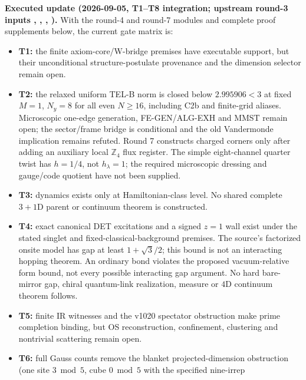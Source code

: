 \documentclass[11pt,a4paper]{article}
\newcommand{\Z}{\mathbb Z}
\begin{document}
\par\smallskip\noindent\textbf{Executed update (2026-09-05, T1--T8 integration; upstream round-3 inputs
,
,
,
).}
With the round-4 and round-7 modules and complete proof supplements below, the current
gate matrix is:
\begin{itemize}
\item \textbf{T1:} the finite axiom-core/W-bridge premises have executable
  support, but their unconditional structure-postulate provenance and the
  dimension selector remain open.
\item \textbf{T2:} the relaxed uniform TEL-B norm is closed below $2.995906<3$
  at fixed $M=1$, $N_y=8$ for all even $N\ge16$, including C2b and finite-grid aliases. Microscopic
  one-edge generation, FE-GEN/ALG-EXH and MMST remain open; the sector/frame
  bridge is conditional and the old Vandermonde implication remains refuted.
  Round 7 constructs charged corners only after adding an auxiliary local
  $\Z_4$ flux register. The simple eight-channel quarter twist has
  $h=1/4$, not $h_\lambda=1$; the required microscopic dressing and
  gauge/code quotient have not been supplied.
\item \textbf{T3:} dynamics exists only at Hamiltonian-class level.  No shared
  complete $3{+}1$D parent or continuum theorem is constructed.
\item \textbf{T4:} exact canonical DET excitations and a signed $z=1$ wall
  exist under the stated singlet and fixed-classical-background premises.
  The source's factorized onsite model has gap at least $1+\sqrt3/2$;
  this bound is not an interacting hopping theorem. An ordinary bond
  violates the proposed vacuum-relative form bound, not every possible
  interacting gap argument. No hard bare-mirror gap, chiral quantum-link realization, measure or
  $4$D continuum theorem follows.
\item \textbf{T5:} finite IR witnesses and the v1020 spectator obstruction make
  prime completion binding, but OS reconstruction, confinement, clustering and
  nontrivial scattering remain open.
\item \textbf{T6:} full Gauss counts remove the blanket projected-dimension
  obstruction (one site $3\bmod5$, cube $0\bmod5$ with the specified nine-irrep

\end{itemize}
\end{document}
